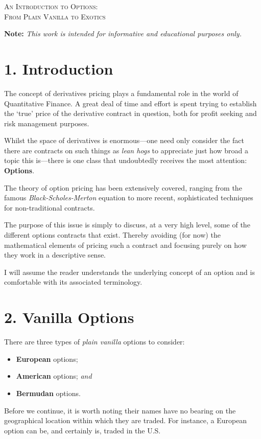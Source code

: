 \documentclass[11pt]{article}
\begin{document}

\begin{tcolorbox}
\begin{center}
    \large
    \textsc{An Introduction to Options: \\ From Plain Vanilla to Exotics}
\end{center}
\end{tcolorbox}

\begin{center}
\textbf{Note:} \textit{This work is intended for informative and educational purposes only.}
\end{center}

\section*{1. Introduction}
The concept of derivatives pricing plays a fundamental role in the world of Quantitative Finance. A great deal of time and effort is spent trying to establish the `true' price of the derivative contract in question, both for profit seeking and risk management purposes. \par

Whilst the space of derivatives is enormous––one need only consider the fact there are contracts on such things as \textit{lean hogs} to appreciate just how broad a topic this is––there is one class that undoubtedly receives the most attention: \textbf{Options}. \par

The theory of option pricing has been extensively covered, ranging from the famous \textit{Black-Scholes-Merton} equation to more recent, sophisticated techniques for non-traditional contracts. \par

The purpose of this issue is simply to discuss, at a very high level, some of the different options contracts that exist. Thereby avoiding (for now) the mathematical elements of pricing such a contract and focusing purely on how they work in a descriptive sense.

I will assume the reader understands the underlying concept of an option and is comfortable with its associated terminology.

\section*{2. Vanilla Options}
There are three types of \textit{plain vanilla} options to consider:
\begin{itemize}
    \item \textbf{European} options;
    \item \textbf{American} options; \textit{and}
    \item \textbf{Bermudan} options.
\end{itemize}
Before we continue, it is worth noting their names have no bearing on the geographical location within which they are traded. For instance, a European option can be, and certainly is, traded in the U.S.
\end{document}
